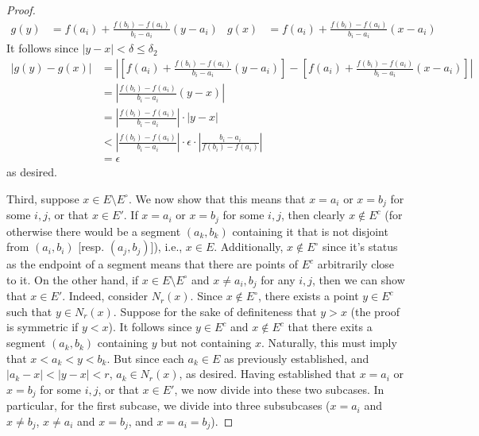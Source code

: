 \documentclass[../psets.tex]{subfiles}
\begin{document}
\begin{enumerate}[label={\textbf{\arabic*.}}]
\begin{proof}
        \begin{align*}
            g(y) &= f(a_i)+\frac{f(b_i)-f(a_i)}{b_i-a_i}(y-a_i)&
            g(x) &= f(a_i)+\frac{f(b_i)-f(a_i)}{b_i-a_i}(x-a_i)
        \end{align*}
        It follows since $|y-x|<\delta\leq\delta_2$
        \begin{align*}
            |g(y)-g(x)| &= \left| \left[ f(a_i)+\frac{f(b_i)-f(a_i)}{b_i-a_i}(y-a_i) \right]-\left[ f(a_i)+\frac{f(b_i)-f(a_i)}{b_i-a_i}(x-a_i) \right] \right|\\
            &= \left| \frac{f(b_i)-f(a_i)}{b_i-a_i}(y-x) \right|\\
            &= \left| \frac{f(b_i)-f(a_i)}{b_i-a_i} \right|\cdot|y-x|\\
            &< \left| \frac{f(b_i)-f(a_i)}{b_i-a_i} \right|\cdot\epsilon\cdot\left| \frac{b_i-a_i}{f(b_i)-f(a_i)} \right|\\
            &= \epsilon
        \end{align*}
        as desired.\par\smallskip
        Third, suppose $x\in E\setminus E^\circ$.
        We now show that this means that $x=a_i$ or $x=b_j$ for some $i,j$, or that $x\in E'$. If $x=a_i$ or $x=b_j$ for some $i,j$, then clearly $x\notin E^c$ (for otherwise there would be a segment $(a_k,b_k)$ containing it that is not disjoint from $(a_i,b_i)$ [resp. $(a_j,b_j)$]), i.e., $x\in E$. Additionally, $x\notin E^\circ$ since it's status as the endpoint of a segment means that there are points of $E^c$ arbitrarily close to it. On the other hand, if $x\in E\setminus E^\circ$ and $x\neq a_i,b_j$ for any $i,j$, then we can show that $x\in E'$. Indeed, consider $N_r(x)$. Since $x\notin E^\circ$, there exists a point $y\in E^c$ such that $y\in N_r(x)$. Suppose for the sake of definiteness that $y>x$ (the proof is symmetric if $y<x$). It follows since $y\in E^c$ and $x\notin E^c$ that there exits a segment $(a_k,b_k)$ containing $y$ but not containing $x$. Naturally, this must imply that $x<a_k<y<b_k$. But since each $a_k\in E$ as previously established, and $|a_k-x|<|y-x|<r$, $a_k\in N_r(x)$, as desired. Having established that $x=a_i$ or $x=b_j$ for some $i,j$, or that $x\in E'$, we now divide into these two subcases. In particular, for the first subcase, we divide into three subsubcases ($x=a_i$ and $x\neq b_j$, $x\neq a_i$ and $x=b_j$, and $x=a_i=b_j$).\par

\end{proof}
\end{enumerate}
\end{document}

